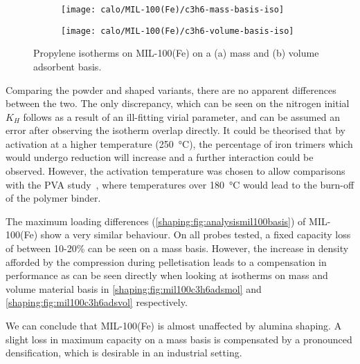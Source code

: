 \begin{figure}[htb]
	\centering
	\begin{subfigure}{0.45\textwidth}
		\texttt{[image: calo/MIL-100(Fe)/c3h6-mass-basis-iso]}
		\caption{}%
		\label{shaping:fig:mil100c3h6adsmol}
	\end{subfigure}%
	\begin{subfigure}{0.45\textwidth}
		\texttt{[image: calo/MIL-100(Fe)/c3h6-volume-basis-iso]}
		\caption{}%
		\label{shaping:fig:mil100c3h6adsvol}
	\end{subfigure}%
	\caption{Propylene isotherms on MIL-100(Fe) on a (a) mass
		and (b) volume adsorbent basis.}%
	\label{shaping:fig:mil100isotherms}
\end{figure}

Comparing the powder and shaped variants, there are no
apparent differences between the two. The only discrepancy,
which can be seen on the nitrogen initial \(K_H\) follows
as a result of an ill-fitting virial parameter,
and can be assumed an error after observing the isotherm
overlap directly. It could be theorised that by activation at
a higher temperature (\SI{250}{\degreeCelsius}),
the percentage of iron trimers which would undergo reduction will
increase and a further interaction could be observed.
However, the activation temperature was chosen to allow
comparisons with the PVA study~\cite{chanutObservingEffectsShaping2016},
where temperatures over \SI{180}{\degreeCelsius} would lead to the
burn-off of the polymer binder.

The maximum loading differences (\autoref{shaping:fig:analysismil100basis})
of MIL-100(Fe) show a very similar behaviour.
On all probes tested, a fixed capacity
loss of between 10-20\% can be seen on a mass
basis. However, the increase in density afforded by the
compression during pelletisation leads to a compensation in
performance as can be seen directly when looking at isotherms on mass and
volume material basis in \autoref{shaping:fig:mil100c3h6adsmol} and
\autoref{shaping:fig:mil100c3h6adsvol} respectively.

We can conclude that MIL-100(Fe) is almost unaffected by alumina shaping.
A slight loss in maximum capacity on a mass basis is compensated by a pronounced densification, which is desirable in an industrial setting.
